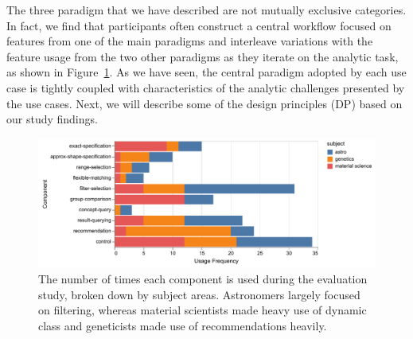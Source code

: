 \par The three paradigm that we have described are not mutually exclusive categories. In fact, we find that participants often construct a central workflow focused on features from one of the main paradigms and interleave variations with the feature usage from the two other paradigms as they iterate on the analytic task, as shown in Figure~\ref{fig:usagefreqbysubject}. As we have seen, the central paradigm adopted by each use case is tightly coupled with characteristics of the analytic challenges presented by the use cases. Next, we will describe some of the design principles (DP) based on our study findings.
\begin{figure}[h!]
  \includegraphics[width=\linewidth]{figures/usagefreqbysubject.pdf}
  \caption{The number of times each component is used during the evaluation study, broken down by subject areas. Astronomers largely focused on filtering, whereas material scientists made heavy use of dynamic class and geneticists made use of recommendations heavily.}\label{fig:usagefreqbysubject}
\end{figure}

